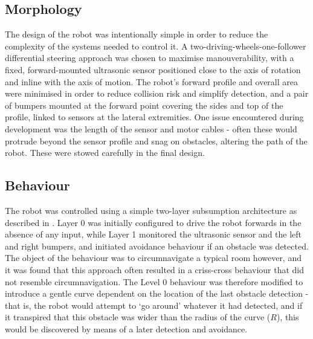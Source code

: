 \documentclass[a4paper,12pt]{article}
\begin{document}
\subsection{Morphology}
The design of the robot was intentionally simple in order to reduce the complexity of the systems needed to control it. A two-driving-wheels-one-follower differential steering approach was chosen to maximise manouverability, with a fixed, forward-mounted ultrasonic sensor positioned close to the axis of rotation and inline with the axis of motion. The robot's forward profile and overall area were minimised in order to reduce collision risk and simplify detection, and a pair of bumpers mounted at the forward point covering the sides and top of the profile, linked to sensors at the lateral extremities. One issue encountered during development was the length of the sensor and motor cables - often these would protrude beyond the sensor profile and snag on obstacles, altering the path of the robot. These were stowed carefully in the final design. 

\subsection{Behaviour}
The robot was controlled using a simple two-layer subsumption architecture as described in \citet{BrooksAIJ91}. Layer 0 was initially configured to drive the robot forwards in the absence of any input, while Layer 1 monitored the ultrasonic sensor and the left and right bumpers, and initiated avoidance behaviour if an obstacle was detected. The object of the behaviour was to circumnavigate a typical room however, and it was found that this approach often resulted in a criss-cross behaviour that did not resemble circumnavigation. The Level 0 behaviour was therefore modified to introduce a gentle curve dependent on the location of the last obstacle detection - that is, the robot would attempt to `go around' whatever it had detected, and if it transpired that this obstacle was wider than the radius of the curve ($R$), this would be discovered by means of a later detection and avoidance.
\end{document}

